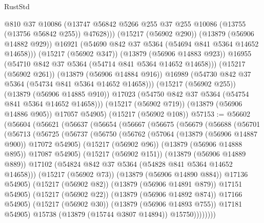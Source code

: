 \begin{lexlean}{RustStd}
\begin{coremodule}
                  @810
                  @37
                  @10086
                  (@13747 @56842 @5266 @255 @37 @255 @10086 (@13755 (@13756 @56842 @255)) @47628)))
              (@15217 (@56902 @290))
              (@13879 (@56906 @14882 @929))
              @16921
              (@54690 @842 @37 @5364 (@54694 @841 @5364 @14652 @14658)))
            (@15217 (@56902 @347))
            (@13879 (@56906 @14883 @923))
            @16955
            (@54710 @842 @37 @5364 (@54714 @841 @5364 @14652 @14658)))
          (@15217 (@56902 @261))
          (@13879 (@56906 @14884 @916))
          @16989
          (@54730 @842 @37 @5364 (@54734 @841 @5364 @14652 @14658)))
        (@15217 (@56902 @255))
        (@13879 (@56906 @14885 @910))
        @17023
        (@54750 @842 @37 @5364 (@54754 @841 @5364 @14652 @14658)))
      (@15217 (@56902 @719))
      (@13879 (@56906 @14886 @905))
      @17057
      @54905)
    (@15217 (@56902 @108))
@57153 := @56602
    (@56604
      (@56621
        (@56637
          (@56654
            (@56667
              (@56675
                (@56679
                  (@56688
                    (@56701
                      (@56713
                        (@56725
                          (@56737
                            (@56750
                              (@56762
                                (@57064 (@13879 (@56906 @14887 @900)) @17072 @54905)
                                (@15217 (@56902 @96))
                                (@13879 (@56906 @14888 @895))
                                @17087
                                @54905)
                              (@15217 (@56902 @151))
                              (@13879 (@56906 @14889 @889))
                              @17102
                              (@54824 @842 @37 @5364 (@54828 @841 @5364 @14652 @14658)))
                            (@15217 (@56902 @73))
                            (@13879 (@56906 @14890 @884))
                            @17136
                            @54905)
                          (@15217 (@56902 @82))
                          (@13879 (@56906 @14891 @879))
                          @17151
                          @54905)
                        (@15217 (@56902 @22))
                        (@13879 (@56906 @14892 @874))
                        @17166
                        @54905)
                      (@15217 (@56902 @30))
                      (@13879 (@56906 @14893 @755))
                      @17181
                      @54905)
                    @15738
                    (@13879 (@15744 @3807 @14894))
                    @15750))))))))

\end{coremodule}
\end{lexlean}
